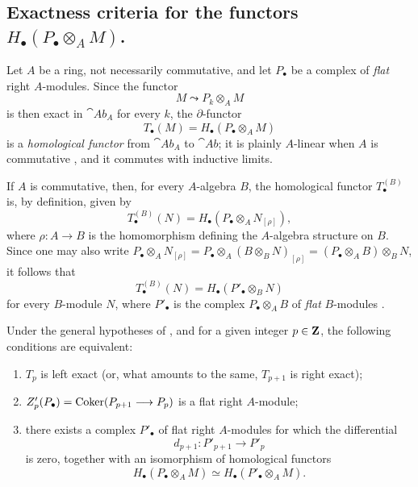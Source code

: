 \subsection{\texorpdfstring{Exactness criteria for the functors
$H_\bullet(P_\bullet\otimes_A M)$.}{Exactness criteria for the functors H.(P. tensor M)}}
\label{subsection:III.7.4}
\label{III.7.4}

\begin{env}[7.4.1]
\label{III.7.4.1}
Let $A$ be a ring, not necessarily commutative, and let
$P_\bullet$ be a complex of \emph{flat} right $A$-modules.  Since the
functor
\[
  M\leadsto P_k\otimes_A M
\]
is then exact in $\cat{Ab}_A$ for every $k$, the
$\partial$-functor
\[
  T_\bullet(M)=H_\bullet(P_\bullet\otimes_A M)
  \tag{7.4.1.1}\label{III.7.4.1.1.eq}
\]
is a \emph{homological functor} from $\cat{Ab}_A$ to
$\cat{Ab}$; it is plainly $A$-linear when $A$ is commutative
, and it commutes with inductive limits.

If $A$ is commutative, then, for every $A$-algebra $B$, the
homological functor $T_\bullet^{(B)}$  is, by
definition, given by
\[
  T_\bullet^{(B)}(N)
  =
  H_\bullet(P_\bullet\otimes_A N_{[\rho]}),
  \tag{7.4.1.2}\label{III.7.4.1.2.eq}
\]
where $\rho:A\to B$ is the homomorphism defining the
$A$-algebra structure on $B$.  Since one may also write $P_\bullet\otimes_A N_{[\rho]}=P_\bullet\otimes_A(B\otimes_B N)_{[\rho]}=(P_\bullet\otimes_A B)\otimes_B N$,
it follows that
\[
  T_\bullet^{(B)}(N)
  =
  H_\bullet(P'_\bullet\otimes_B N)
  \tag{7.4.1.3}\label{III.7.4.1.3.eq}
\]
for every $B$-module $N$, where $P'_\bullet$ is the complex
$P_\bullet\otimes_A B$ of \emph{flat} $B$-modules
.
\end{env}

\begin{proposition}[7.4.2]
\label{III.7.4.2}
Under the general hypotheses of , and for a
given integer $p\in\mathbf{Z}$, the following conditions are
equivalent:
\begin{enumerate}
  \item[(a)] $T_p$ is left exact \textup{(or, what amounts to the same,}
    $T_{p+1}$ is right exact);
  \item[(b)] $Z'_p(P_\bullet)
=
\operatorname{Coker}(P_{p+1}\longrightarrow P_p)$
    is a flat right $A$-module;
  \item[(c)] there exists a complex $P'_\bullet$ of flat right
    $A$-modules for which the differential
    \[
      d_{p+1}:P'_{p+1}\longrightarrow P'_p
    \]
    is zero, together with an isomorphism of homological
    functors
    \[
      H_\bullet(P_\bullet\otimes_A M)
      \simeq
      H_\bullet(P'_\bullet\otimes_A M).
    \]
\end{enumerate}
\end{proposition}

